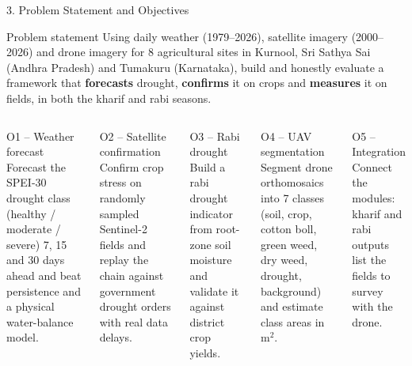 \documentclass[aspectratio=169,10pt]{beamer}
\begin{document}
\begin{frame}{3. Problem Statement and Objectives}
\begin{block}{Problem statement}
\footnotesize Using daily weather (1979--2026), satellite imagery (2000--2026) and drone imagery for 8 agricultural sites in Kurnool, Sri Sathya Sai (Andhra Pradesh) and Tumakuru (Karnataka), build and honestly evaluate a framework that \textbf{forecasts} drought, \textbf{confirms} it on crops and \textbf{measures} it on fields, in both the kharif and rabi seasons.
\end{block}
\begin{columns}[T]
\begin{block}{O1 -- Weather forecast}
\footnotesize Forecast the SPEI-30 drought class (healthy / moderate / severe) 7, 15 and 30 days ahead and beat persistence and a physical water-balance model.
\end{block}
\begin{block}{O2 -- Satellite confirmation}
\footnotesize Confirm crop stress on randomly sampled Sentinel-2 fields and replay the chain against government drought orders with real data delays.
\end{block}
\begin{block}{O3 -- Rabi drought}
\footnotesize Build a rabi drought indicator from root-zone soil moisture and validate it against district crop yields.
\end{block}
\begin{block}{O4 -- UAV segmentation}
\footnotesize Segment drone orthomosaics into 7 classes (soil, crop, cotton boll, green weed, dry weed, drought, background) and estimate class areas in m$^2$.
\end{block}
\begin{block}{O5 -- Integration}
\footnotesize Connect the modules: kharif and rabi outputs list the fields to survey with the drone.
\end{block}
\end{columns}
\end{frame}
\end{document}
